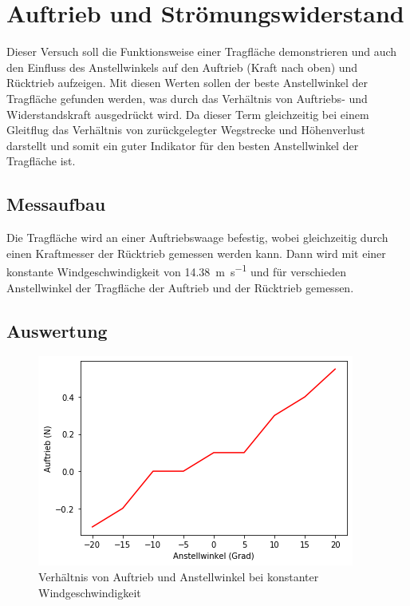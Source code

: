 \section{Auftrieb und Strömungswiderstand}

Dieser Versuch soll die Funktionsweise einer Tragfläche demonstrieren und auch den Einfluss des Anstellwinkels auf den Auftrieb (Kraft nach oben) und Rücktrieb aufzeigen. Mit diesen Werten sollen der beste Anstellwinkel der Tragfläche gefunden werden, was durch das Verhältnis von Auftriebs- und Widerstandskraft ausgedrückt wird. Da dieser Term gleichzeitig bei einem Gleitflug das Verhältnis von zurückgelegter Wegstrecke und Höhenverlust darstellt und somit ein guter Indikator für den besten Anstellwinkel der Tragfläche ist.

\subsection{Messaufbau}

Die Tragfläche wird an einer Auftriebswaage befestig, wobei gleichzeitig durch einen Kraftmesser der Rücktrieb gemessen werden kann. Dann wird mit einer konstante Windgeschwindigkeit von \SI{14.38}{\metre\per\second} und für verschieden Anstellwinkel der Tragfläche der Auftrieb und der Rücktrieb gemessen.

\subsection{Auswertung}

\begin{figure}
    \centering
    \includegraphics[scale=0.8]{Aeromechanik/Protokoll/fig/Aeromechanik Versuch 3.11.png}
    \caption{Verhältnis von Auftrieb und Anstellwinkel bei konstanter Windgeschwindigkeit}
    \label{fig:Aeoromechanik Versuch 3.11}
\end{figure}

